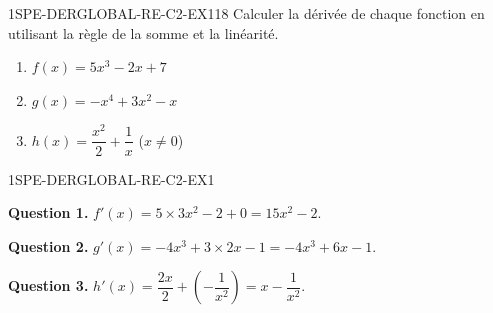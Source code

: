 

\begin{exercice}{1SPE-DERGLOBAL-RE-C2-EX1}{1}{8}
Calculer la dérivée de chaque fonction en utilisant la règle de la somme et la linéarité.
\begin{enumerate}
  \item $f(x) = 5x^3 - 2x + 7$
  \item $g(x) = -x^4 + 3x^2 - x$
  \item $h(x) = \dfrac{x^2}{2} + \dfrac{1}{x}$ \quad ($x
\neq 0$)
\end{enumerate}
\end{exercice}



\begin{corrige}{1SPE-DERGLOBAL-RE-C2-EX1}


\textbf{Question 1.}
$f'(x) = 5 \times 3x^2 - 2 + 0 = 15x^2 - 2.$

\textbf{Question 2.}
$g'(x) = -4x^3 + 3 \times 2x - 1 = -4x^3 + 6x - 1.$

\textbf{Question 3.}
$h'(x) = \dfrac{2x}{2} + \left(-\dfrac{1}{x^2}\right) = x - \dfrac{1}{x^2}.$

\end{corrige}


